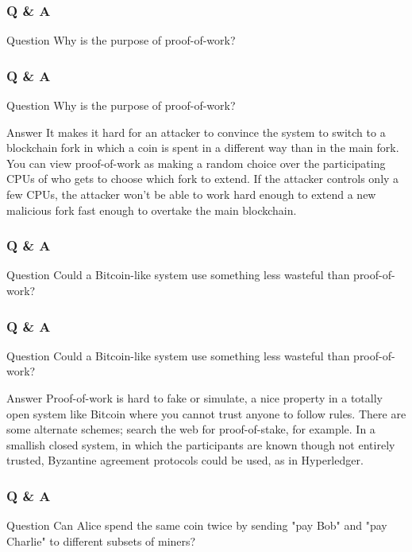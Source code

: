 \begin{frame}
    \frametitle{Q \& A}
    \begin{block}{Question}
Why is the purpose of proof-of-work?
    \end{block}
\end{frame}

\begin{frame}
    \frametitle{Q \& A}
    \begin{block}{Question}
Why is the purpose of proof-of-work?
    \end{block}

    \begin{block}{Answer}
It makes it hard for an attacker to convince the system to switch
to a blockchain fork in which a coin is spent in a different way than
in the main fork. You can view proof-of-work as making a random choice
over the participating CPUs of who gets to choose which fork to
extend. If the attacker controls only a few CPUs, the attacker won't
be able to work hard enough to extend a new malicious fork fast enough
to overtake the main blockchain.
    \end{block}
\end{frame}

\begin{frame}
    \frametitle{Q \& A}
    \begin{block}{Question}
Could a Bitcoin-like system use something less wasteful than
proof-of-work?
    \end{block}
\end{frame}

\begin{frame}
    \frametitle{Q \& A}
    \begin{block}{Question}
Could a Bitcoin-like system use something less wasteful than
proof-of-work?
    \end{block}

    \begin{block}{Answer}
Proof-of-work is hard to fake or simulate, a nice property in a
totally open system like Bitcoin where you cannot trust anyone to
follow rules. There are some alternate schemes; search the web for
proof-of-stake, for example. In a smallish closed system, in which the
participants are known though not entirely trusted, Byzantine
agreement protocols could be used, as in Hyperledger.
    \end{block}
\end{frame}

\begin{frame}
    \frametitle{Q \& A}
    \begin{block}{Question}
Can Alice spend the same coin twice by sending "pay Bob" and "pay
Charlie" to different subsets of miners?
    \end{block}
\end{frame}

